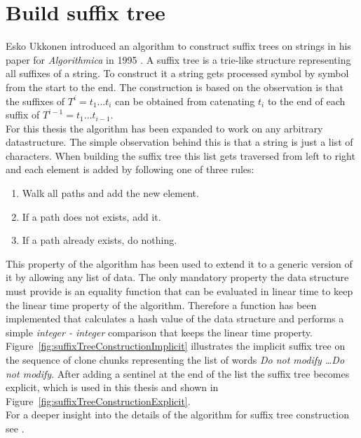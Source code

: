 \section{Build suffix tree}
Esko Ukkonen introduced an algorithm to construct suffix trees on strings in his paper for \textit{Algorithmica} in 1995 \cite{Ukkonen1995}. A suffix tree is a trie-like structure representing all suffixes of a string. To construct it a string gets processed symbol by symbol from the start to the end. The construction is based on the observation is that the suffixes of $T^i = t_1 \dots t_i$ can be obtained from catenating $t_i$ to the end of each suffix of $T^{i-1} = t_1 \dots t_{i-1}$. \cite{Ukkonen1995}\\
For this thesis the algorithm has been expanded to work on any arbitrary datastructure. The simple observation behind this is that a string is just a list of characters. When building the suffix tree this list gets traversed from left to right and each element is added by following one of three rules:
\begin{enumerate}
	\item Walk all paths and add the new element.
	\item If a path does not exists, add it.
	\item If a path already exists, do nothing.
\end{enumerate}
This property of the algorithm has been used to extend it to a generic version of it by allowing any list of data. The only mandatory property the data structure must provide is an equality function that can be evaluated in linear time to keep the linear time property of the algorithm. Therefore a function has been implemented that calculates a hash value of the data structure and performs a simple \textit{integer - integer} comparison that keeps the linear time property.\\
Figure~\ref{fig:suffixTreeConstructionImplicit} illustrates the implicit suffix tree on the sequence of clone chunks representing the list of words \textit{Do not modify \dots Do not modify}. After adding a sentinel at the end of the list the suffix tree becomes explicit, which is used in this thesis and shown in Figure~\ref{fig:suffixTreeConstructionExplicit}.\\
For a deeper insight into the details of the algorithm for suffix tree construction see \cite{Ukkonen1995}. 



